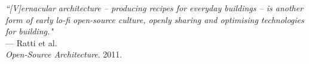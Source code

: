 \begin{flushright}
\small{
\textit{
``[V]ernacular architecture – producing recipes for everyday buildings – is another form of early lo-fi open-source culture, openly sharing and optimising technologies for building."}} \\ --- Ratti et al. \\ \textit{Open-Source Architecture}. 2011.
\end{flushright}
